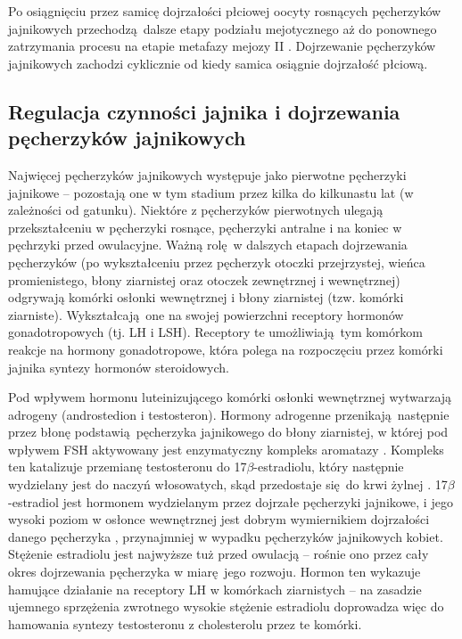 \documentclass[two column, twoside, a4paper]{article}
\begin{document}
Po osiągnięciu przez samicę dojrzałości płciowej oocyty rosnących pęcherzyków jajnikowych przechodzą dalsze etapy podziału mejotycznego aż do ponownego zatrzymania procesu na etapie metafazy mejozy II \autocite{Sawicki2017}. Dojrzewanie pęcherzyków jajnikowych zachodzi cyklicznie od kiedy samica osiągnie dojrzałość płciową.

\subsection{Regulacja czynności jajnika i dojrzewania pęcherzyków jajnikowych}

Najwięcej pęcherzyków jajnikowych występuje jako pierwotne pęcherzyki jajnikowe -- pozostają one w tym stadium przez kilka do kilkunastu lat (w zależności od gatunku). Niektóre z pęcherzyków pierwotnych ulegają przekształceniu w pęcherzyki rosnące, pęcherzyki antralne i na koniec w pęchrzyki przed owulacyjne. Ważną rolę w dalszych etapach dojrzewania pęcherzyków (po wykształceniu przez pęcherzyk otoczki przejrzystej, wieńca promienistego, błony ziarnistej oraz otoczek zewnętrznej i wewnętrznej) odgrywają komórki osłonki wewnętrznej i błony ziarnistej (tzw. komórki ziarniste). Wykształcają one na swojej powierzchni receptory hormonów gonadotropowych (tj. LH i LSH). Receptory te umożliwiają tym komórkom reakcje na hormony gonadotropowe, która polega na rozpoczęciu przez komórki jajnika syntezy hormonów steroidowych. \autocite{Krzymowski2005}

Pod wpływem hormonu luteinizującego komórki osłonki wewnętrznej wytwarzają adrogeny (androstedion i testosteron). Hormony adrogenne przenikają następnie przez błonę podstawią pęcherzyka jajnikowego do błony ziarnistej, w której pod wpływem FSH aktywowany jest enzymatyczny kompleks aromatazy \autocite{erickson1978}. Kompleks ten katalizuje przemianę testosteronu do 17$\beta$-estradiolu, który następnie wydzielany jest do naczyń włosowatych, skąd przedostaje się do krwi żylnej \autocite{Abubakar1971}. 17$\beta$-estradiol jest hormonem wydzielanym przez dojrzałe pęcherzyki jajnikowe, i jego wysoki poziom w osłonce wewnętrznej jest dobrym wymiernikiem dojrzałości danego pęcherzyka \autocite{Thorneycroft1971}, przynajmniej w wypadku pęcherzyków jajnikowych kobiet. Stężenie estradiolu jest najwyższe tuż przed owulacją -- rośnie ono przez cały okres dojrzewania pęcherzyka w miarę jego rozwoju. Hormon ten wykazuje hamujące działanie na receptory LH w komórkach ziarnistych -- na zasadzie ujemnego sprzężenia zwrotnego wysokie stężenie estradiolu doprowadza więc do hamowania syntezy testosteronu z cholesterolu przez te komórki.
\end{document}
